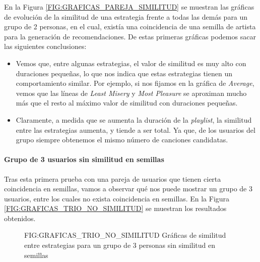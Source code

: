 En la Figura \ref{FIG:GRAFICAS_PAREJA_SIMILITUD} se muestran las gráficas de evolución de la similitud de una estrategia frente a 
todas las demás para un grupo de 2 personas, en el cual, existía una coincidencia de una semilla de artista para la generación de 
recomendaciones. De estas primeras gráficas podemos sacar las siguientes conclusiones:

\begin{itemize}
    \item Vemos que, entre algunas estrategias, el valor de similitud es muy alto con duraciones pequeñas, lo que nos indica que estas estrategias tienen
    un comportamiento similar. Por ejemplo, si nos fijamos en la gráfica de \textit{Average}, vemos que las líneas de \textit{Least Misery} y \textit{Most Pleasure}
    se aproximan mucho más que el resto al máximo valor de similitud con duraciones pequeñas.
    \item Claramente, a medida que se aumenta la duración de la \textit{playlist}, la similitud entre las estrategias aumenta, y tiende 
    a ser total. Ya que, de los usuarios del grupo siempre obtenemos el mismo número de canciones candidatas.
\end{itemize}

\paragraph{Grupo de 3 usuarios sin similitud en semillas}

Tras esta primera prueba con una pareja de usuarios que tienen cierta coincidencia en semillas, vamos a observar qué nos puede mostrar
un grupo de 3 usuarios, entre los cuales no exista coincidencia en semillas. En la Figura \ref{FIG:GRAFICAS_TRIO_NO_SIMILITUD} se muestran los
resultados obtenidos.

\begin{figure}[Gráficas de similitud entre estrategias para un grupo de 3 personas sin similitud en semillas]{FIG:GRAFICAS_TRIO_NO_SIMILITUD}
    {Gráficas de similitud entre estrategias para un grupo de 3 personas sin similitud en semillas}
\end{figure}

